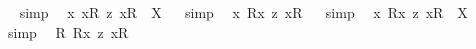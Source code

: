 \begin{isabellebody}
\isadelimproof
\ %
\endisadelimproof
%
\isatagproof
{}\isamarkupfalse%
\ {\isacharparenleft}simp{\isacharparenright}\ \isamarkupfalse%
%
\endisatagproof
{\isafoldproof}%
%
\isadelimproof
%
\endisadelimproof
\isanewline
{}\isamarkupfalse%
\ {\isachardoublequoteopen}{\isasymforall}{\isacharparenleft}{\isasymlambda}x{\isachardot}\ {\isacharless}{\isachardot}x{\isachardot}{\isasymcirc}R{}{\isachargreater}\ {\isasymrightarrow}\isactrlsup z\ {\isacharless}{\isachardot}x{\isachardot}{\isasymcirc}R{}{\isachargreater}{\isacharparenright}\ {\isacharequal}\ X{\isachardoublequoteclose}%
\isadelimproof
\ %
\endisadelimproof
%
\isatagproof
{}\isamarkupfalse%
\ {\isacharparenleft}simp{\isacharparenright}\ \isamarkupfalse%
%
\endisatagproof
{\isafoldproof}%
%
\isadelimproof
%
\endisadelimproof
\isanewline
\isanewline
{}\isamarkupfalse%
\ {\isachardoublequoteopen}{\isacharbrackleft}{\isasymforall}{\isacharparenleft}{\isasymlambda}x{\isachardot}\ {\isacharless}R{}{\isasymbullet}{\isachardot}x{\isachardot}{\isachargreater}\ {\isasymrightarrow}\isactrlsup z\ {\isacharless}{\isachardot}x{\isachardot}{\isasymcirc}R{}{\isachargreater}{\isacharparenright}{\isacharbrackright}{\isachardoublequoteclose}%
\isadelimproof
\ %
\endisadelimproof
%
\isatagproof
{}\isamarkupfalse%
\ {\isacharparenleft}simp{\isacharparenright}\ \isamarkupfalse%
%
\endisatagproof
{\isafoldproof}%
%
\isadelimproof
%
\endisadelimproof
\isanewline
{}\isamarkupfalse%
\ {\isachardoublequoteopen}{\isasymforall}{\isacharparenleft}{\isasymlambda}x{\isachardot}\ {\isacharless}R{}{\isasymbullet}{\isachardot}x{\isachardot}{\isachargreater}\ {\isasymrightarrow}\isactrlsup z\ {\isacharless}{\isachardot}x{\isachardot}{\isasymcirc}R{}{\isachargreater}{\isacharparenright}\ {\isacharequal}\ X{\isachardoublequoteclose}%
\isadelimproof
\ %
\endisadelimproof
%
\isatagproof
{}\isamarkupfalse%
\ {\isacharparenleft}simp{\isacharparenright}\ \isamarkupfalse%
%
\endisatagproof
{\isafoldproof}%
%
\isadelimproof
%
\endisadelimproof
\isanewline
{}\isamarkupfalse%
\ {\isachardoublequoteopen}{\isacharbrackleft}{\isasymforall}{\isacharparenleft}{\isasymlambda}R{\isachardot}\ {\isacharless}{\isachardot}R{\isachardot}{\isasymbullet}{\isachardot}x{\isachardot}{\isachargreater}\ {\isasymrightarrow}\isactrlsup z\ {\isacharless}{\isachardot}x{\isachardot}{\isasymcirc}{\isachardot}R{\isachardot}{\isachargreater}{\isacharparenright}{\isacharbrackright}{\isachardoublequoteclose}%

\end{isabellebody}
